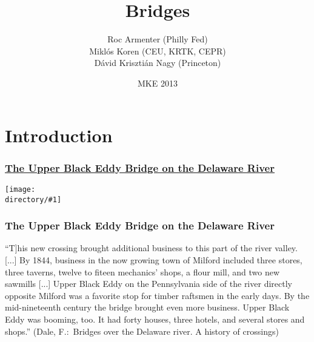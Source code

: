 \documentclass[compress,mathserif]{beamer}
\newcommand{\directory}{exhibits}
\newcommand{\widefigure}[2]{\begin{frame}\frametitle{\hyperlink{#1back}{#2}}\hypertarget{#1}{{\begin{center}\texttt{[image: \\directory/\#1]}\end{center}}}\end{frame}}
\begin{document}
\title{Bridges}
\author{Roc Armenter (Philly Fed)\\
Miklós Koren (CEU, KRTK, CEPR)\\
Dávid Krisztián Nagy (Princeton)}
\date{MKE 2013}
\maketitle

\section{Introduction}
\widefigure{upper-black-eddy}{The Upper Black Eddy Bridge on the Delaware River}

\begin{frame}
\frametitle{The Upper Black Eddy Bridge on the Delaware River}

\textquotedblleft \lbrack T]his new crossing brought additional business to
this part of the river valley. [...] By 1844, business in the now growing
town of Milford included three stores, three taverns, twelve to fiteen
mechanics' shops, a flour mill, and two new sawmills [...] Upper Black Eddy
on the Pennsylvania side of the river directly opposite Milford was a
favorite stop for timber raftsmen in the early days. By the mid-nineteenth
century the bridge brought even more business. Upper Black Eddy was booming,
too. It had forty houses, three hotels, and several stores and
shops.\textquotedblright \bigskip \newline
(Dale, F.:\ Bridges over the Delaware river. A history of crossings)

\end{frame}%
\end{document}
